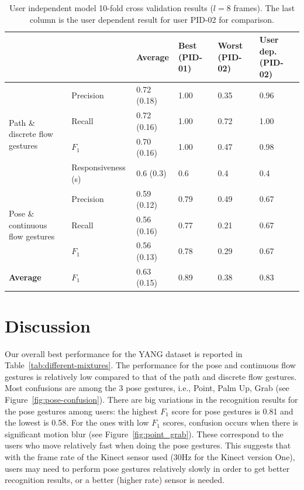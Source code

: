 \begin{table}[tbh]
\centering
\begin{tabular}{|p{3cm}|l|l|p{1.9cm}|p{1.9cm}||p{2cm}|}
\hline
& & \textbf{Average} & \textbf{Best (PID-01)} & \textbf{Worst (PID-02)} &
\textbf{User dep. (PID-02)} \\
\hline
\multirow{4}{3cm}{Path \& discrete flow gestures} 
& Precision & 0.72 (0.18) & 1.00 & 0.35 & 0.96 \\
\cline{2-6}
& Recall    & 0.72 (0.16) & 1.00 & 0.72 & 1.00\\
\cline{2-6}
& $F_1$ & 0.70 (0.16) & 1.00 & 0.47 & 0.98 \\
\cline{2-6}
& Responsiveness (s) & 0.6 (0.3)  & 0.6 & 0.4 &  0.4\\
\hline
\multirow{3}{3cm}{Pose \& continuous flow gestures}
& Precision & 0.59 (0.12) & 0.79 & 0.49 & 0.67\\
\cline{2-6}
& Recall & 0.56 (0.16) & 0.77 & 0.21 & 0.67\\
\cline{2-6}
& $F_1$ & 0.56 (0.13)  & 0.78 & 0.29 & 0.67\\
\hline
\textbf{Average} & $F_1$ & 0.63 (0.15) & 0.89 & 0.38 & 0.83\\
\hline
\end{tabular}
\caption{User independent model 10-fold cross validation results ($l = 8$
frames). The last column is the user dependent result for user PID-02 for
comparison.}
\label{tab:user-independent}
\end{table}

\section{Discussion}
Our overall best performance for the YANG dataset is reported in
Table~\ref{tab:different-mixtures}. The performance for the pose and
continuous flow gestures is relatively low compared to that of the path and
discrete flow gestures. Most
confusions are among the 3 pose gestures, i.e., Point, Palm Up, Grab (see
Figure~\ref{fig:pose-confusion}).
There are big variations in the recognition results for the pose gestures among users: the highest $F_1$ score for pose gestures is 0.81
and the lowest is 0.58. For the ones with low $F_1$ scores, confusion occurs
when there is significant motion blur (see Figure~\ref{fig:point_grab}). These
correspond to the users who move relatively fast when doing the pose gestures.
This suggests that with the frame rate of the Kinect sensor used (30Hz for
the Kinect version One), users may need to perform pose gestures relatively
slowly in order to get better recognition results, or a better (higher rate)
sensor is needed.


